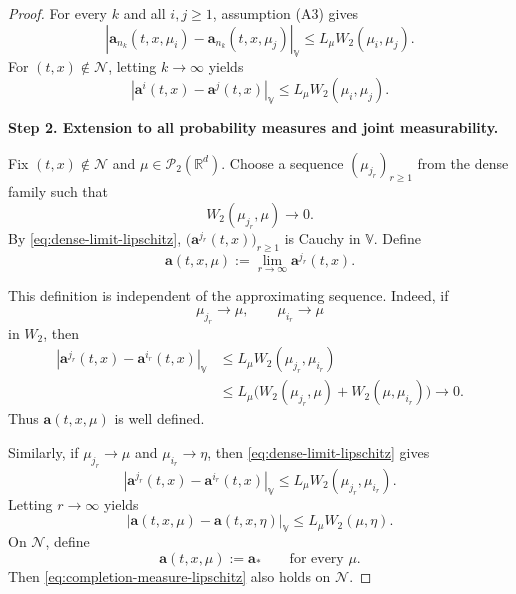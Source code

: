 \documentclass[12pt,oneside, reqno]{amsart}
\numberwithin{equation}{section}
\begin{document}
\begin{proof}
		For every \(k\) and all \(i,j\geq1\), assumption
		\textnormal{(A3)} gives
		\[
		\left|
		\mathbf a_{n_k}(t,x,\mu_i)
		-
		\mathbf a_{n_k}(t,x,\mu_j)
		\right|_{\mathbb V}
		\leq
		L_\mu W_2(\mu_i,\mu_j).
		\]
		For \((t,x)\notin\mathcal N\), letting \(k\to\infty\) yields
		\begin{equation}
			\label{eq:dense-limit-lipschitz}
			\left|
			\mathbf a^i(t,x)-\mathbf a^j(t,x)
			\right|_{\mathbb V}
			\leq
			L_\mu W_2(\mu_i,\mu_j).
		\end{equation}
		
		
		\textbf{Step 2. Extension to all probability measures and joint measurability.}
		
		Fix \((t,x)\notin\mathcal N\) and
		\(\mu\in\mathcal P_2(\mathbb R^d)\). Choose a sequence
		\((\mu_{j_r})_{r\geq1}\) from the dense family such that
		\[
		W_2(\mu_{j_r},\mu)\longrightarrow0.
		\]
		By \eqref{eq:dense-limit-lipschitz},
		\(\bigl(\mathbf a^{j_r}(t,x)\bigr)_{r\geq1}\) is Cauchy in
		\(\mathbb V\). Define
		\[
		\mathbf a(t,x,\mu)
		:=
		\lim_{r\to\infty}
		\mathbf a^{j_r}(t,x).
		\]
		
		This definition is independent of the approximating sequence.
		Indeed, if
		\[
		\mu_{j_r}\longrightarrow\mu,
		\qquad
		\mu_{i_r}\longrightarrow\mu
		\]
		in \(W_2\), then
		\[
		\begin{aligned}
			\left|
			\mathbf a^{j_r}(t,x)
			-
			\mathbf a^{i_r}(t,x)
			\right|_{\mathbb V}
			&\leq
			L_\mu W_2(\mu_{j_r},\mu_{i_r})
			\\
			&\leq
			L_\mu
			\bigl(
			W_2(\mu_{j_r},\mu)
			+
			W_2(\mu,\mu_{i_r})
			\bigr)
			\longrightarrow0.
		\end{aligned}
		\]
		Thus \(\mathbf a(t,x,\mu)\) is well defined.
		
		Similarly, if
		\(\mu_{j_r}\to\mu\) and \(\mu_{i_r}\to\eta\), then
		\eqref{eq:dense-limit-lipschitz} gives
		\[
		\left|
		\mathbf a^{j_r}(t,x)
		-
		\mathbf a^{i_r}(t,x)
		\right|_{\mathbb V}
		\leq
		L_\mu W_2(\mu_{j_r},\mu_{i_r}).
		\]
		Letting \(r\to\infty\) yields
		\begin{equation}
			\label{eq:completion-measure-lipschitz}
			\left|
			\mathbf a(t,x,\mu)
			-
			\mathbf a(t,x,\eta)
			\right|_{\mathbb V}
			\leq
			L_\mu W_2(\mu,\eta).
		\end{equation}
		On \(\mathcal N\), define
		\[
		\mathbf a(t,x,\mu)
		:=
		\mathbf a_\ast
		\qquad
		\text{for every }\mu.
		\]
		Then \eqref{eq:completion-measure-lipschitz} also holds on
		\(\mathcal N\).
		

\end{proof}
\end{document}
